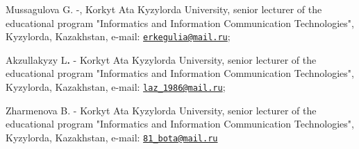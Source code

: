 \begin{authorinfo}
Mussagulova G. -, Korkyt Ata Kyzylorda University, senior lecturer of
the educational program "Informatics and Information Communication
Technologies", Kyzylorda, Kazakhstan,
e-mail: \href{mailto:erkegulia@mail.ru}{\nolinkurl{erkegulia@mail.ru}};

Akzullakyzy L{\bfseries .} - Korkyt Ata Kyzylorda University, senior
lecturer of the educational program "Informatics and Information
Communication Technologies", Kyzylorda, Kazakhstan,
e-mail: \href{mailto:laz_1986@mail.ru}{\nolinkurl{laz\_1986@mail.ru}};

Zharmenova B. - Korkyt Ata Kyzylorda University, senior lecturer of the
educational program "Informatics and Information Communication
Technologies", Kyzylorda, Kazakhstan,
e-mail: \href{mailto:81_bota@mail.ru}{\nolinkurl{81\_bota@mail.ru}}
\end{authorinfo}
